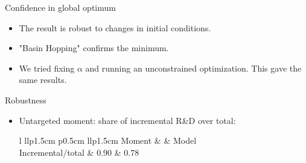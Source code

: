 \documentclass[11pt]{beamer}
\begin{document}
\begin{frame} {Confidence in global optimum}
	\begin{itemize}\itemsep 6pt
		\item The result is robust to changes in initial conditions.
		\item "Basin Hopping" confirms the minimum.
		\item We tried fixing $\alpha$ and running an unconstrained optimization. This gave the same results.
		\begin{center}
		\begin{figure}\centering\label{Innov5}
		\end{figure}
		\end{center}
	\end{itemize}
\end{frame}

\begin{frame} {Robustness}
	\begin{itemize}\itemsep 12pt
		\item Untargeted moment: share of incremental R\&D over total:
		\begin{table}
		\centering
		\begin{tabular}{l llp{1.5cm} p{0.5cm} llp{1.5cm}}
		\toprule
		Moment &  & 				{Model} \\ 
		\midrule
		Incremental/total & 0.90 & 0.78\\
		\bottomrule
		\end{tabular}
		\end{table}
	\end{itemize}
\end{frame}
\end{document}
